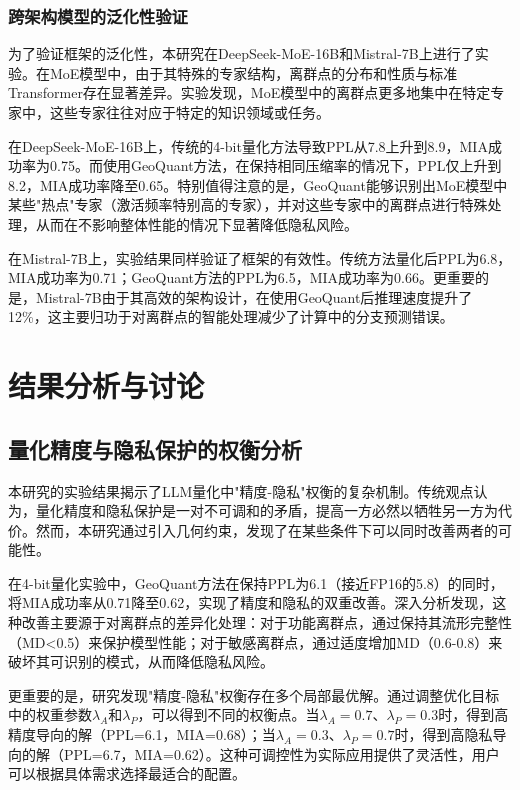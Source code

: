 \subsubsection{跨架构模型的泛化性验证}

为了验证框架的泛化性，本研究在DeepSeek-MoE-16B和Mistral-7B上进行了实验。在MoE模型中，由于其特殊的专家结构，离群点的分布和性质与标准Transformer存在显著差异。实验发现，MoE模型中的离群点更多地集中在特定专家中，这些专家往往对应于特定的知识领域或任务。

在DeepSeek-MoE-16B上，传统的4-bit量化方法导致PPL从7.8上升到8.9，MIA成功率为0.75。而使用GeoQuant方法，在保持相同压缩率的情况下，PPL仅上升到8.2，MIA成功率降至0.65。特别值得注意的是，GeoQuant能够识别出MoE模型中某些"热点"专家（激活频率特别高的专家），并对这些专家中的离群点进行特殊处理，从而在不影响整体性能的情况下显著降低隐私风险。

在Mistral-7B上，实验结果同样验证了框架的有效性。传统方法量化后PPL为6.8，MIA成功率为0.71；GeoQuant方法的PPL为6.5，MIA成功率为0.66。更重要的是，Mistral-7B由于其高效的架构设计，在使用GeoQuant后推理速度提升了12\%，这主要归功于对离群点的智能处理减少了计算中的分支预测错误。

\section{结果分析与讨论}

\subsection{量化精度与隐私保护的权衡分析}

本研究的实验结果揭示了LLM量化中"精度-隐私"权衡的复杂机制。传统观点认为，量化精度和隐私保护是一对不可调和的矛盾，提高一方必然以牺牲另一方为代价。然而，本研究通过引入几何约束，发现了在某些条件下可以同时改善两者的可能性。

在4-bit量化实验中，GeoQuant方法在保持PPL为6.1（接近FP16的5.8）的同时，将MIA成功率从0.71降至0.62，实现了精度和隐私的双重改善。深入分析发现，这种改善主要源于对离群点的差异化处理：对于功能离群点，通过保持其流形完整性（MD<0.5）来保护模型性能；对于敏感离群点，通过适度增加MD（0.6-0.8）来破坏其可识别的模式，从而降低隐私风险。

更重要的是，研究发现"精度-隐私"权衡存在多个局部最优解。通过调整优化目标中的权重参数$\lambda_A$和$\lambda_P$，可以得到不同的权衡点。当$\lambda_A=0.7$、$\lambda_P=0.3$时，得到高精度导向的解（PPL=6.1，MIA=0.68）；当$\lambda_A=0.3$、$\lambda_P=0.7$时，得到高隐私导向的解（PPL=6.7，MIA=0.62）。这种可调控性为实际应用提供了灵活性，用户可以根据具体需求选择最适合的配置。

